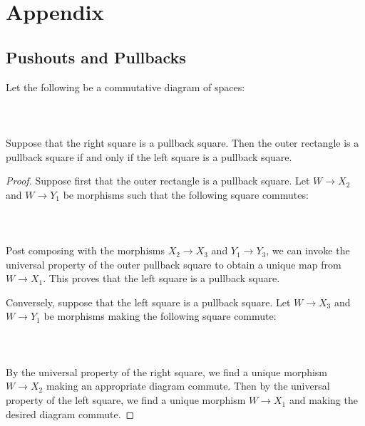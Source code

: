 \section{Appendix}
\subsection{Pushouts and Pullbacks}
\begin{prp}\label{prp:Pasting1} Let the following be a commutative diagram of spaces: \\~\\
\\~\\
Suppose that the right square is a pullback square. Then the outer rectangle is a pullback square if and only if the left square is a pullback square. 
\begin{proof}
Suppose first that the outer rectangle is a pullback square. Let $W\to X_2$ and $W\to Y_1$ be morphisms such that the following square commutes: \\~\\
\\~\\
Post composing with the morphisms $X_2\to X_3$ and $Y_1\to Y_3$, we can invoke the universal property of the outer pullback square to obtain a unique map from $W\to X_1$. This proves that the left square is a pullback square. 

Conversely, suppose that the left square is a pullback square. Let $W\to X_3$ and $W\to Y_1$ be morphisms making the following square commute: \\~\\
\\~\\
By the universal property of the right square, we find a unique morphism $W\to X_2$ making an appropriate diagram commute. Then by the universal property of the left square, we find a unique morphism $W\to X_1$ and making the desired diagram commute. 
\end{proof}
\end{prp}

